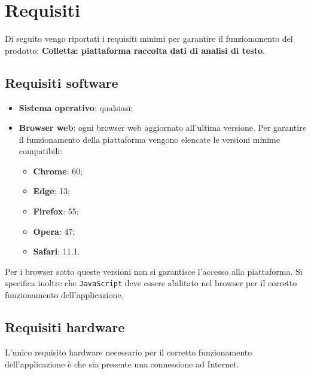 \section{Requisiti}

    Di seguito vengo riportati i requisiti minimi per garantire il funzionamento del prodotto: 
\textbf{Colletta: piattaforma raccolta dati di analisi di testo}. 


\subsection{Requisiti software}
\begin{itemize}
\item \textbf{Sistema operativo}: qualsiasi;
\item \textbf{Browser web}: ogni browser web aggiornato all'ultima versione. Per garantire il funzionamento della piattaforma vengono elencate le versioni minime compatibili:
	\begin{itemize}
		\item \textbf{Chrome}: 60;
		\item \textbf{Edge}: 13;
		\item \textbf{Firefox}: 55;
		\item \textbf{Opera}: 47;
		\item \textbf{Safari}: 11.1.
	\end{itemize}
\end{itemize}
Per i browser sotto queste versioni non si garantisce l'accesso alla piattaforma. Si specifica inoltre che \texttt{JavaScript} deve essere abilitato nel browser per il corretto funzionamento dell'applicazione.

\subsection{Requisiti hardware}
L'unico requisito hardware necessario per il corretto funzionamento dell'applicazione è che sia presente una connessione ad Internet. 
\newpage
